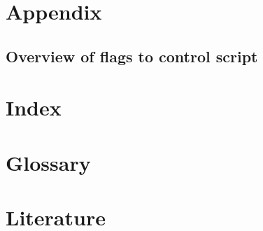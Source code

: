 \appendix
\section*{Appendix}
\begin{landscape}
	\section{Overview of flags to control script}
	
\end{landscape}
\section{Index}
\printindex
\vspace{2cm}
\section{Glossary}\renewcommand*\acronymname{}
\printglossaries
\section{Literature}

